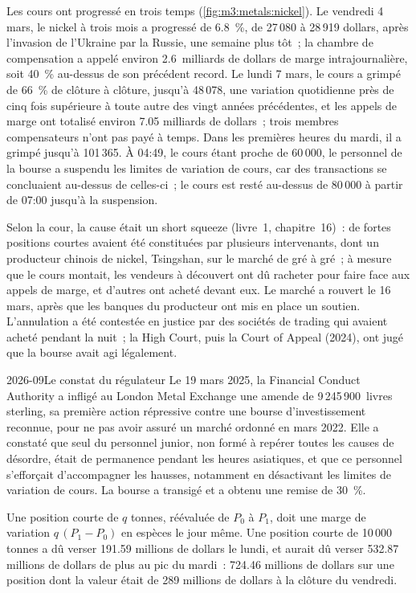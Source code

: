 Les cours ont progressé en trois temps (\cref{fig:m3:metals:nickel}). Le vendredi 4 mars, le nickel à trois
mois a progressé de 6.8~\%, de 27\,080 à 28\,919 dollars, après l'invasion de l'Ukraine par la Russie, une
semaine plus tôt~; la chambre de compensation a appelé environ 2.6~milliards de dollars de marge intrajournalière, soit
40~\% au-dessus de son précédent record. Le lundi 7 mars, le cours a grimpé de 66~\% de clôture à clôture, jusqu'à 48\,078,
une variation quotidienne près de cinq fois supérieure à toute autre des vingt années précédentes, et les appels de marge ont totalisé environ 7.05
milliards de dollars~; trois membres compensateurs n'ont pas payé à temps. Dans les premières heures du mardi, il
a grimpé jusqu'à 101\,365. À 04:49, le cours étant proche de 60\,000, le personnel de la bourse a suspendu les
limites de variation de cours, car des transactions se concluaient au-dessus de celles-ci~; le cours est resté au-dessus de 80\,000 à partir
de 07:00 jusqu'à la suspension.

Selon la cour, la cause était un short squeeze (livre~1, chapitre~16)~: de fortes positions courtes avaient été
constituées par plusieurs intervenants, dont un producteur chinois de nickel,
Tsingshan, sur le marché de gré à gré~; à mesure que le cours montait, les vendeurs à découvert ont dû racheter pour faire face aux appels de marge,
et d'autres ont acheté devant eux. Le marché a rouvert le 16 mars, après que les banques du producteur
ont mis en place un soutien. L'annulation a été contestée en justice par des sociétés de trading qui avaient
acheté pendant la nuit~; la High Court, puis la Court of Appeal (2024), ont jugé que la
bourse avait agi légalement.

\begin{dated}{2026-09}{Le constat du régulateur}\label{dat:m3:metals:fca}
Le 19 mars 2025, la Financial Conduct Authority a infligé au London Metal Exchange
une amende de 9\,245\,900~livres sterling, sa première action répressive contre une bourse d'investissement reconnue,
pour ne pas avoir assuré un marché ordonné en mars 2022. Elle a constaté que seul du personnel junior, non formé
à repérer toutes les causes de désordre, était de permanence pendant les heures asiatiques, et que ce personnel
s'efforçait d'accompagner les hausses, notamment en désactivant les limites de variation de cours. La bourse a transigé et a obtenu une
remise de 30~\%.
\end{dated}

\begin{proposition}\label{prop:m3:metals:margin}
Une position courte de $q$ tonnes, réévaluée de $P_0$ à $P_1$, doit une marge de variation $q\,(P_1 - P_0)$ en
espèces le jour même. Une position courte de 10\,000 tonnes a dû verser 191.59 millions de dollars le lundi, et
aurait dû verser 532.87 millions de dollars de plus au pic du mardi~: 724.46 millions de dollars sur une position
dont la valeur était de 289 millions de dollars à la clôture du vendredi.
\end{proposition}

